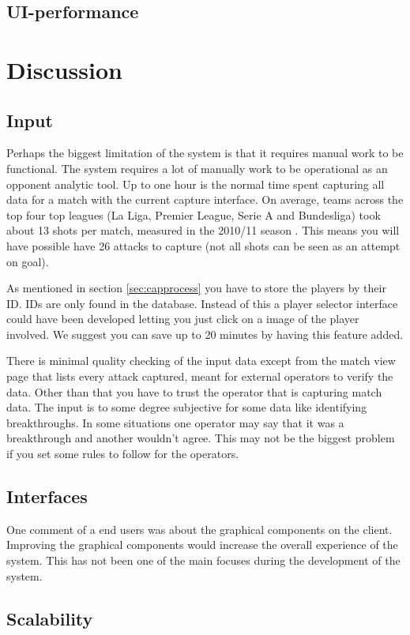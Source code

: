 \subsection{UI-performance}

\section{Discussion}
\subsection{Input}

Perhaps the biggest limitation of the system is that it requires manual work to be functional. The system requires a lot of manually work to be operational as an opponent analytic tool. Up to one hour is the normal time spent capturing all data for a match with the current capture interface. On average, teams across the top four top leagues (La Liga, Premier League, Serie A and Bundesliga) took about 13 shots per match, measured in the 2010/11 season \cite{soccerbynumbers}. This means you will have possible have 26 attacks to capture (not all shots can be seen as an attempt on goal).

As mentioned in section \ref{sec:capprocess} you have to store the players by their ID. IDs are only found in the database. Instead of this a player selector interface could have been developed letting you just click on a image of the player involved. We suggest you can save up to 20 minutes by having this feature added.

There is minimal quality checking of the input data except from the match view page that lists every attack captured, meant for external operators to verify the data. Other than that you have to trust the operator that is capturing match data. The input is to some degree subjective for some data like identifying breakthroughs. In some situations one operator may say that it was a breakthrough and another wouldn't agree. This may not be the biggest problem if you set some rules to follow for the operators.

\subsection{Interfaces}

One comment of a end users was about the graphical components on the client. Improving the graphical components would increase the overall experience of the system. This has not been one of the main focuses during the development of the system.

\subsection{Scalability}


